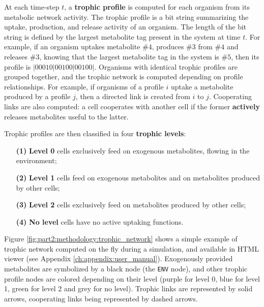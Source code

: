 At each time-step $t$, a \textbf{trophic profile} is computed for each organism from its metabolic network activity. The trophic profile is a bit string summarizing the uptake, production, and release activity of an organism. The length of the bit string is defined by the largest metabolite tag present in the system at time $t$. For example, if an organism uptakes metabolite $\#4$, produces $\#3$ from $\#4$ and releases $\#3$, knowing that the largest metabolite tag in the system is $\#5$, then its profile is $|00010|00100|00100|$. Organisms with identical trophic profiles are grouped together, and the trophic network is computed depending on profile relationships. For example, if organisms of a profile $i$ uptake a metabolite produced by a profile $j$, then a directed link is created from $i$ to $j$. Cooperating links are also computed: a cell cooperates with another cell if the former \textbf{actively} releases metabolites useful to the latter.

Trophic profiles are then classified in four \textbf{trophic levels}:
\begin{enumerate}
\item[\textbf{(1)}] \textbf{Level 0} cells exclusively feed on exogenous metabolites, flowing in the environment;
\item[\textbf{(2)}] \textbf{Level 1} cells feed on exogenous metabolites and on metabolites produced by other cells;
\item[\textbf{(3)}] \textbf{Level 2} cells exclusively feed on metabolites produced by other cells;
\item[\textbf{(4)}] \textbf{No level} cells have no active uptaking functions.
\end{enumerate}

Figure \ref{fig:part2:methodology:trophic_network} shows a simple example of trophic network computed on the fly during a simulation, and available in {\EvoEvoSim} HTML viewer (see Appendix \ref{ch:appendix:user_manual}). Exogenously provided metabolites are symbolized by a black node (the \texttt{ENV} node), and other trophic profile nodes are colored depending on their level (purple for level 0, blue for level 1, green for level 2 and grey for no level). Trophic links are represented by solid arrows, cooperating links being represented by dashed arrows.

